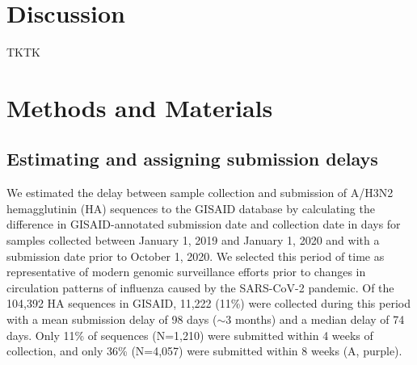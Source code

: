 \documentclass[9pt,lineno]{elife}
\begin{document}
\section{Discussion}

TKTK








\section{Methods and Materials}

\subsection{Estimating and assigning submission delays}

We estimated the delay between sample collection and submission of A/H3N2 hemagglutinin (HA) sequences to the GISAID database \citep{gisaid} by calculating the difference in GISAID-annotated submission date and collection date in days for samples collected between January 1, 2019 and January 1, 2020 and with a submission date prior to October 1, 2020.
We selected this period of time as representative of modern genomic surveillance efforts prior to changes in circulation patterns of influenza caused by the SARS-CoV-2 pandemic.
Of the 104,392 HA sequences in GISAID, 11,222 (11\%) were collected during this period with a mean submission delay of 98 days ($\sim$3 months) and a median delay of 74 days.
Only 11\% of sequences (N=1,210) were submitted within 4 weeks of collection, and only 36\% (N=4,057) were submitted within 8 weeks (A, purple).
\end{document}
